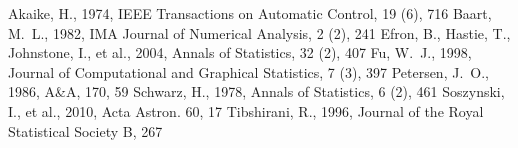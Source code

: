 \documentclass[11pt,twoside]{book}
\begin{document}
\begin{thebibliography}{}      
Akaike, H., 1974, IEEE Transactions on Automatic Control, 19 (6), 716
Baart, M.~L., 1982, IMA Journal of Numerical Analysis, 2 (2), 241
Efron, B., Hastie, T., Johnstone, I., et al., 2004, Annals of Statistics, 32 (2), 407
Fu, W.~J., 1998, Journal of Computational and Graphical Statistics, 7 (3), 397
Petersen, J.~O., 1986, A\&A, 170, 59
Schwarz, H., 1978, Annals of Statistics, 6 (2), 461
Soszynski, I., et al., 2010, Acta Astron. 60, 17
Tibshirani, R., 1996, Journal of the Royal Statistical Society B, 267
\end{thebibliography}
\end{document}
